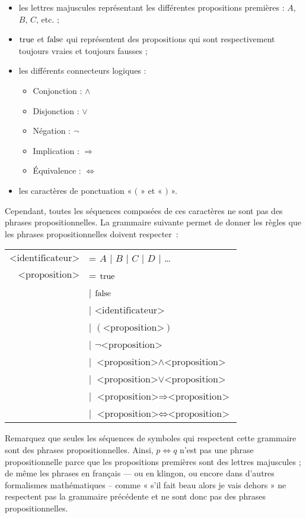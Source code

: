 \begin{itemize}
\item les lettres majuscules représentant les différentes propositions
  premières : $A$, $B$, $C$, etc. ;
\item $\mathrm{true}$ et $\mathrm{false}$ qui représentent des propositions qui sont
  respectivement toujours vraies et toujours fausses ;
\item les différents connecteurs logiques :
	\begin{itemize}
	\item Conjonction : $\land$
	\item Disjonction : $\lor$
	\item Négation :  $\lnot$
	\item Implication :  $\Rightarrow$
	\item Équivalence :  $\Leftrightarrow$
	\end{itemize}
\item les caractères de ponctuation « $($ » et « $)$ ».
\end{itemize}

Cependant, toutes les séquences composées de ces caractères ne sont pas des
phrases propositionnelles. La grammaire suivante permet de donner les règles que
les phrases propositionnelles doivent respecter~:

\begin{tabular}{rl}
  $\textrm{<identificateur>}$ & = $A$ | $B$ | $C$ | $D$ | \dots \\
  $\textrm{<proposition>}$
  & = $\mathrm{true}$ \\
  & | $\mathrm{false}$ \\
  & | $\textrm{<identificateur>}$ \\
  & | $(\textrm{<proposition>})$ \\
  & | $\lnot \textrm{<proposition>}$ \\
  & | $\textrm{<proposition>} \land \textrm{<proposition>}$ \\
  & | $\textrm{<proposition>} \lor \textrm{<proposition>}$ \\
  & | $\textrm{<proposition>} \Rightarrow \textrm{<proposition>}$ \\
  & | $\textrm{<proposition>} \Leftrightarrow \textrm{<proposition>}$
\end{tabular}
\vspace{2 mm}

Remarquez que seules les séquences de symboles qui respectent cette
grammaire sont des phrases propositionnelles. Ainsi, $p \Leftrightarrow q$
n’est pas une phrase propositionnelle parce que les propositions
premières sont des lettres majuscules ; de même les phrases en français —
ou en klingon, ou encore dans d’autres formalismes mathématiques – comme «
  s’il fait beau alors je vais dehors » ne respectent pas la grammaire
précédente et ne sont donc pas des phrases propositionnelles.

